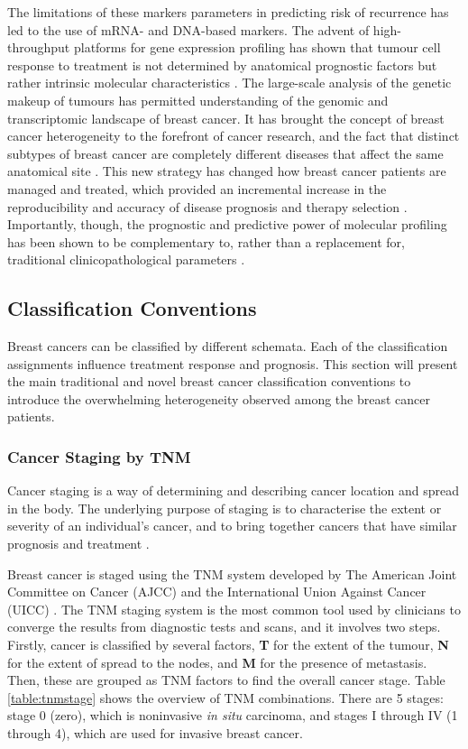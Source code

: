     The limitations of these markers parameters in predicting risk of recurrence has led to the use of mRNA- and DNA-based markers. The advent of high-throughput platforms for gene expression profiling has shown that tumour cell response to treatment is not determined by anatomical prognostic factors but rather intrinsic molecular characteristics \cite{Iwamoto2010PredictingData}. The large-scale analysis of the genetic makeup of tumours has permitted understanding of the genomic and transcriptomic landscape of breast cancer. It has brought the concept of breast cancer heterogeneity to the forefront of cancer research, and the fact that distinct subtypes of breast cancer are completely different diseases that affect the same anatomical site \cite{weigelt2010}. This new strategy has changed how breast cancer patients are managed and treated, which provided an incremental increase in the reproducibility and accuracy of disease prognosis and therapy selection \cite{pusztai2008}. Importantly, though, the prognostic and predictive power of molecular profiling has been shown to be complementary to, rather than a replacement for, traditional clinicopathological parameters \cite{weigelt2010}.

   
    \subsection{Classification Conventions} \label{section:classification}
    
    Breast cancers can be classified by different schemata. Each of the classification assignments influence treatment response and prognosis.  This section will present the main traditional and novel breast cancer classification conventions to introduce the overwhelming heterogeneity observed among the breast cancer patients. 


    \subsubsection{Cancer Staging by TNM}
    
    Cancer staging is a way of determining and describing cancer location and spread in the body. The underlying purpose of staging is to characterise the extent or severity of an individual’s cancer, and to bring together cancers that have similar prognosis and treatment \cite{2017AJCCStaging}. 

    Breast cancer is staged using the TNM system developed by The American Joint Committee on Cancer (AJCC) and the International Union Against Cancer (UICC) \cite{Giuliano2017}. The TNM staging system is the most common tool used by clinicians to converge the results from diagnostic tests and scans, and it involves two steps. Firstly, cancer is classified by several factors, \textbf{T} for the extent of the tumour, \textbf{N} for the extent of spread to the nodes, and \textbf{M} for the presence of metastasis. Then, these are grouped as TNM factors to find the overall cancer stage. Table \ref{table:tnmstage} shows the overview of TNM combinations. There are 5 stages: stage 0 (zero), which is noninvasive \textit{in situ} carcinoma, and stages I through IV (1 through 4), which are used for invasive breast cancer.


